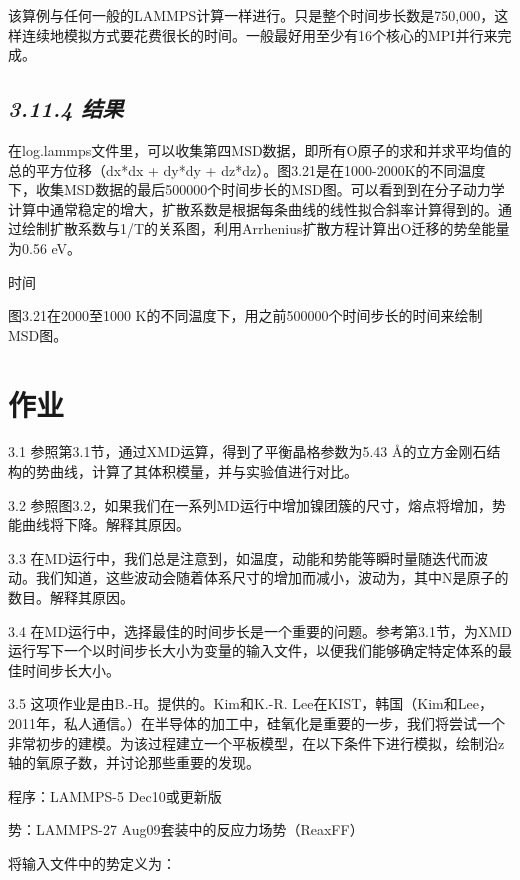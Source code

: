 该算例与任何一般的LAMMPS计算一样进行。只是整个时间步长数是750,000，这样连续地模拟方式要花费很长的时间。一般最好用至少有16个核心的MPI并行来完成。

\hypertarget{ux7ed3ux679c-10}{%
\subsection{\texorpdfstring{\emph{3.11.4
结果}}{3.11.4 结果}}\label{ux7ed3ux679c-10}}

在log.lammps文件里，可以收集第四MSD数据，即所有O原子的求和并求平均值的总的平方位移（dx*dx
+ dy*dy +
dz*dz）。图3.21是在1000-2000K的不同温度下，收集MSD数据的最后500000个时间步长的MSD图。可以看到到在分子动力学计算中通常稳定的增大，扩散系数是根据每条曲线的线性拟合斜率计算得到的。通过绘制扩散系数与1/T的关系图，利用Arrhenius扩散方程计算出O迁移的势垒能量为0.56
eV。


时间

图3.21在2000至1000
K的不同温度下，用之前500000个时间步长的时间来绘制MSD图。

\hypertarget{ux4f5cux4e1a}{%
\section{作业}\label{ux4f5cux4e1a}}

3.1 参照第3.1节，通过XMD运算，得到了平衡晶格参数为5.43
Å的立方金刚石结构的势曲线，计算了其体积模量，并与实验值进行对比。

3.2
参照图3.2，如果我们在一系列MD运行中增加镍团簇的尺寸，熔点将增加，势能曲线将下降。解释其原因。

3.3
在MD运行中，我们总是注意到，如温度，动能和势能等瞬时量随迭代而波动。我们知道，这些波动会随着体系尺寸的增加而减小，波动为，其中N是原子的数目。解释其原因。

3.4
在MD运行中，选择最佳的时间步长是一个重要的问题。参考第3.1节，为XMD运行写下一个以时间步长大小为变量的输入文件，以便我们能够确定特定体系的最佳时间步长大小。

3.5 这项作业是由B.-H。提供的。Kim和K.-R.
Lee在KIST，韩国（Kim和Lee，2011年，私人通信。）在半导体的加工中，硅氧化是重要的一步，我们将尝试一个非常初步的建模。为该过程建立一个平板模型，在以下条件下进行模拟，绘制沿z轴的氧原子数，并讨论那些重要的发现。

程序：LAMMPS-5 Dec10或更新版

势：LAMMPS-27 Aug09套装中的反应力场势（ReaxFF）

将输入文件中的势定义为：

